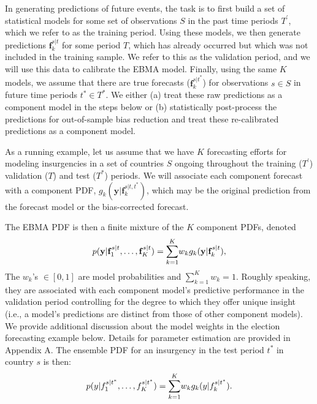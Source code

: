 In generating predictions of future events, the task is to first build
a set of statistical models for some set of observations $S$ in the
past time periods $T^{\prime}$, which we refer to as the training
period.  Using these models, we then generate predictions
$\mathbf{f}^{s|t}_k$ for some period $T$, which has already occurred
but which was not included in the training sample.  We refer to this
as the validation period, and we will use this data to calibrate the
EBMA model.  Finally, using the same $K$ models, we assume that there
are true forecasts ($\mathbf{f}_k^{s|t^\ast}$) for observations $s \in
S$ in future time periods $t^\ast \in
T^*$.  We either (a) treat these raw predictions as a
component model in the steps below or (b) statistically post-process
the predictions for out-of-sample bias reduction and treat these
re-calibrated predictions as a component model.

As a running example, let us assume that we have $K$ forecasting
efforts for modeling insurgencies in a set of countries $S$ ongoing
throughout the training ($T^{\prime}$) validation ($T$) and test
($T^\ast$) periods.  We will associate each component forecast with a
component PDF, $g_k(\mathbf{y}|\mathbf{f}_k^{s|t, t^\ast})$, which may
be the original prediction from the forecast model or the
bias-corrected forecast.


The EBMA PDF is then a finite mixture of the $K$ component PDFs,
denoted
\begin{equation}
\small
\label{BMA-eq}
p(\mathbf{y}|\mathbf{f}_1^{s|t}, \ldots, \mathbf{f}_K^{s|t})=\overset{K}{\underset{k=1}{\sum}} w_k
g_k(\mathbf{y}|\mathbf{f}_k^{s|t}),
\end{equation}
\noindent The $w_k$'s $\in [0,1]$ are model probabilities and
$\sum_{k=1}^Kw_k=1$.  Roughly speaking, they are associated with each
component model's predictive performance in the validation period
controlling for the degree to which they offer unique insight (i.e.,
a model's predictions are distinct from those of other component models).
We provide additional discussion about the model weights in the
election forecasting example below.  Details for parameter estimation
are provided in Appendix A.  The ensemble PDF for an insurgency in the
test period $t^\ast$ in country $s$ is then:
\begin{equation}
\label{BMA-eq2}
\small
p(y|f_{1}^{s|t^\ast}, \ldots,
f_{K}^{s|t^\ast})=\overset{K}{\underset{k=1}{\sum}} w_k
g_k(y|f_{k}^{s|t^*}).
\end{equation}


